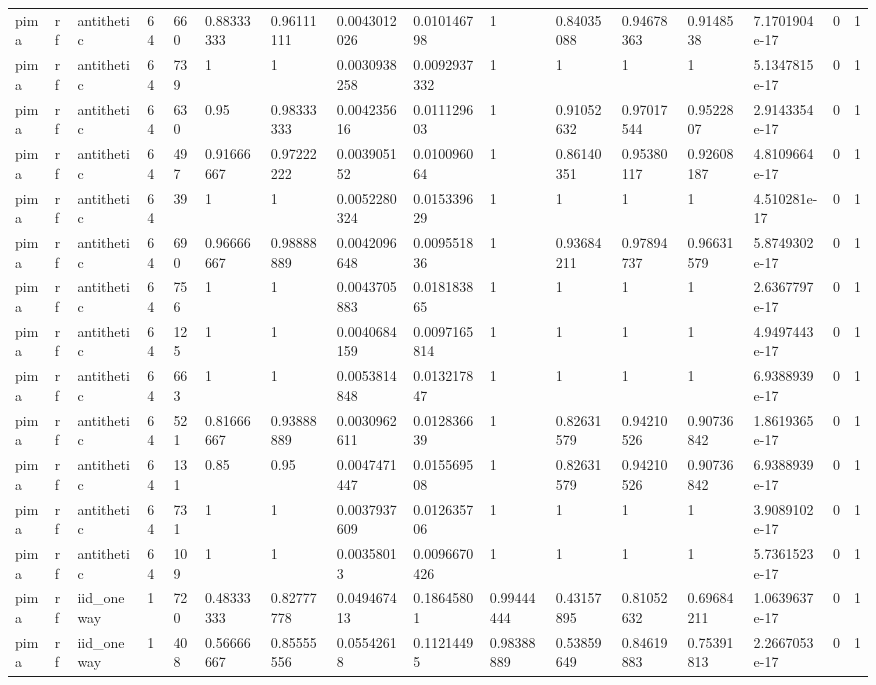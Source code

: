 \begin{tabular}{llllllllllllllll}
pima & rf & antithetic & 64 & 660 & 0.88333333 & 0.96111111 & 0.0043012026 & 0.010146798 & 1 & 0.84035088 & 0.94678363 & 0.9148538 & 7.1701904e-17 & 0 & 1 \\
pima & rf & antithetic & 64 & 739 & 1 & 1 & 0.0030938258 & 0.0092937332 & 1 & 1 & 1 & 1 & 5.1347815e-17 & 0 & 1 \\
pima & rf & antithetic & 64 & 630 & 0.95 & 0.98333333 & 0.004235616 & 0.011129603 & 1 & 0.91052632 & 0.97017544 & 0.9522807 & 2.9143354e-17 & 0 & 1 \\
pima & rf & antithetic & 64 & 497 & 0.91666667 & 0.97222222 & 0.003905152 & 0.010096064 & 1 & 0.86140351 & 0.95380117 & 0.92608187 & 4.8109664e-17 & 0 & 1 \\
pima & rf & antithetic & 64 & 39 & 1 & 1 & 0.0052280324 & 0.015339629 & 1 & 1 & 1 & 1 & 4.510281e-17 & 0 & 1 \\
pima & rf & antithetic & 64 & 690 & 0.96666667 & 0.98888889 & 0.0042096648 & 0.009551836 & 1 & 0.93684211 & 0.97894737 & 0.96631579 & 5.8749302e-17 & 0 & 1 \\
pima & rf & antithetic & 64 & 756 & 1 & 1 & 0.0043705883 & 0.018183865 & 1 & 1 & 1 & 1 & 2.6367797e-17 & 0 & 1 \\
pima & rf & antithetic & 64 & 125 & 1 & 1 & 0.0040684159 & 0.0097165814 & 1 & 1 & 1 & 1 & 4.9497443e-17 & 0 & 1 \\
pima & rf & antithetic & 64 & 663 & 1 & 1 & 0.0053814848 & 0.013217847 & 1 & 1 & 1 & 1 & 6.9388939e-17 & 0 & 1 \\
pima & rf & antithetic & 64 & 521 & 0.81666667 & 0.93888889 & 0.0030962611 & 0.012836639 & 1 & 0.82631579 & 0.94210526 & 0.90736842 & 1.8619365e-17 & 0 & 1 \\
pima & rf & antithetic & 64 & 131 & 0.85 & 0.95 & 0.0047471447 & 0.015569508 & 1 & 0.82631579 & 0.94210526 & 0.90736842 & 6.9388939e-17 & 0 & 1 \\
pima & rf & antithetic & 64 & 731 & 1 & 1 & 0.0037937609 & 0.012635706 & 1 & 1 & 1 & 1 & 3.9089102e-17 & 0 & 1 \\
pima & rf & antithetic & 64 & 109 & 1 & 1 & 0.00358013 & 0.0096670426 & 1 & 1 & 1 & 1 & 5.7361523e-17 & 0 & 1 \\
pima & rf & iid\_oneway & 1 & 720 & 0.48333333 & 0.82777778 & 0.049467413 & 0.18645801 & 0.99444444 & 0.43157895 & 0.81052632 & 0.69684211 & 1.0639637e-17 & 0 & 1 \\
pima & rf & iid\_oneway & 1 & 408 & 0.56666667 & 0.85555556 & 0.05542618 & 0.11214495 & 0.98388889 & 0.53859649 & 0.84619883 & 0.75391813 & 2.2667053e-17 & 0 & 1 \\

\end{tabular}

